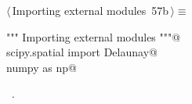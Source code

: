 \documentclass[11pt,oneside]{article}    %
\begin{document}
\begin{flushleft} \small \label{scrap101}
\protect{}$\langle\,$Importing external modules\nobreak\ {\footnotesize 57b}$\,\rangle\equiv$
\vspace{-1ex}
\begin{list}{}{} \item
\mbox{}\verb@""" Importing external modules """@\\
\mbox{}\verb@from scipy.spatial import Delaunay@\\
\mbox{}\verb@import numpy as np@\\
\mbox{}\verb@@{\NWsep}
\end{list}
\vspace{-1ex}
\footnotesize\addtolength{\baselineskip}{-1ex}
\begin{list}{}{\setlength{\itemsep}{-\parsep}\setlength{\itemindent}{-\leftmargin}}
\item \NWtxtMacroRefIn\ .
\end{list}
\end{flushleft}
\end{document}

